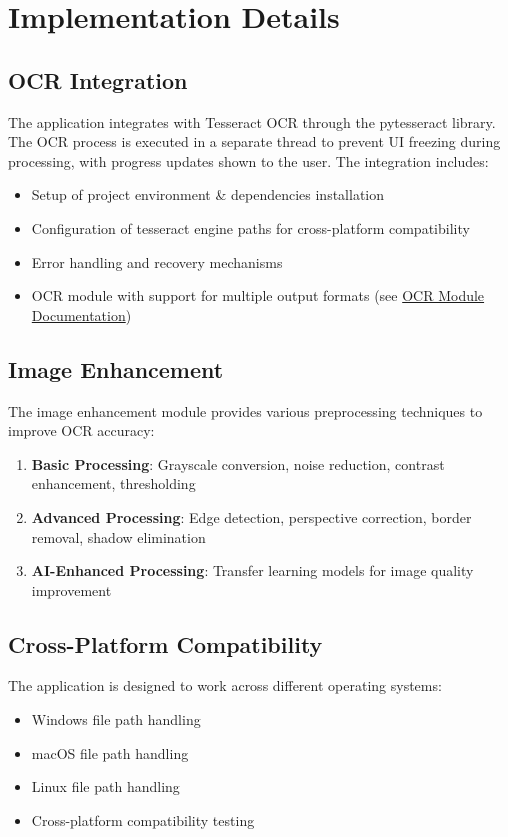 \documentclass[12pt]{article}
\begin{document}
\section{Implementation Details}

\subsection{OCR Integration}
The application integrates with Tesseract OCR through the pytesseract library. The OCR process is executed in a separate thread to prevent UI freezing during processing, with progress updates shown to the user. The integration includes:
\begin{itemize}
    \item Setup of project environment \& dependencies installation
    \item Configuration of tesseract engine paths for cross-platform compatibility
    \item Error handling and recovery mechanisms
    \item OCR module with support for multiple output formats (see \href{../ocrMod/main.tex}{OCR Module Documentation})
\end{itemize}

\subsection{Image Enhancement}
The image enhancement module provides various preprocessing techniques to improve OCR accuracy:
\begin{enumerate}
    \item \textbf{Basic Processing}: Grayscale conversion, noise reduction, contrast enhancement, thresholding
    \item \textbf{Advanced Processing}: Edge detection, perspective correction, border removal, shadow elimination
    \item \textbf{AI-Enhanced Processing}: Transfer learning models for image quality improvement
\end{enumerate}

\subsection{Cross-Platform Compatibility}
The application is designed to work across different operating systems:
\begin{itemize}
    \item Windows file path handling
    \item macOS file path handling
    \item Linux file path handling
    \item Cross-platform compatibility testing
\end{itemize}
\end{document}
